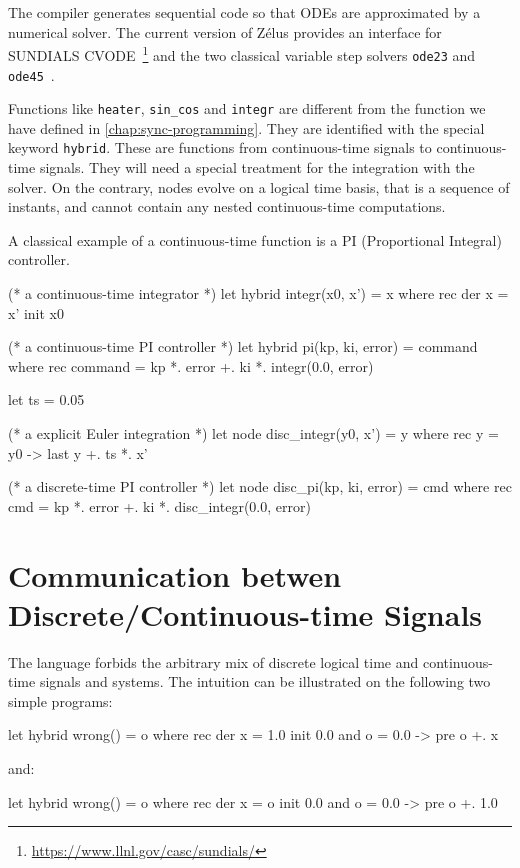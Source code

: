 \documentclass[11pt,titlepage,twoside]{report}
\newcommand{\zelus}{{\sf Z\'elus}}
\newcommand{\Remark}{\medskip\noindent{\bf Remark: }}
\begin{document}
\Remark The compiler generates sequential code so that \acp{ODE} are
approximated by a numerical solver. The current version of \zelus{}
provides an interface for SUNDIALS
CVODE~\cite{sundials:2005}\footnote{\url{https://www.llnl.gov/casc/sundials/}}
and the two classical variable step solvers \texttt{ode23} and
\texttt{ode45}~\cite{DahlquistBjo08}.

\medskip Functions like \verb+heater+, \verb+sin_cos+ and
\verb+integr+ are different from the function we have defined in
\cref{chap:sync-programming}. They are identified
with the special keyword \texttt{hybrid}. These are functions from
continuous-time signals to continuous-time signals. They will need a
special treatment for the integration with the solver. On the
contrary, nodes evolve on a logical time basis, that is a sequence of
instants, and cannot contain any nested continuous-time computations.

A classical example of a continuous-time function is a PI
(Proportional Integral) controller.

\begin{runverbatim}[withresult]
(* a continuous-time integrator *)
let hybrid integr(x0, x') = x where
  rec der x = x' init x0

(* a continuous-time PI controller *)
let hybrid pi(kp, ki, error) = command where
  rec command = kp *. error +. ki *. integr(0.0, error) 

let ts = 0.05

(* a explicit Euler integration *)
let node disc_integr(y0, x') = y where
  rec y = y0 -> last y +. ts *. x'

(* a discrete-time PI controller *)
let node disc_pi(kp, ki, error) = cmd where
  rec cmd = kp *. error +. ki *. disc_integr(0.0, error)
\end{runverbatim}

\section{Communication betwen Discrete/Continuous-time Signals} %

The language forbids the arbitrary mix of discrete logical time and
continuous-time signals and systems. The intuition can be illustrated
on the following two simple programs:

\begin{runverbatim}[fail]
let hybrid wrong() = o where
  rec der x = 1.0 init 0.0
  and o = 0.0 -> pre o +. x
\end{runverbatim}
and:
\begin{runverbatim}[fail]
let hybrid wrong() = o where
  rec der x = o init 0.0
  and o = 0.0 -> pre o +. 1.0
\end{runverbatim}
\end{document}

